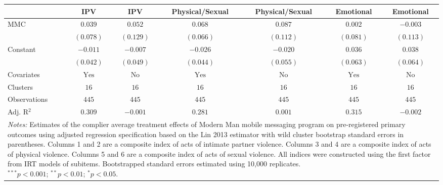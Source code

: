 
\begin{tabular}{l c c c c c c}
\toprule
 & IPV & IPV & Physical/Sexual & Physical/Sexual & Emotional & Emotional \\
\midrule
MMC          & $0.039$        & $0.052$       & $0.068$        & $0.087$       & $0.002$        & $-0.003$      \\
             & $(0.078)$      & $(0.129)$     & $(0.066)$      & $(0.112)$     & $(0.081)$      & $(0.113)$     \\
Constant     & $-0.011$       & $-0.007$      & $-0.026$       & $-0.020$      & $0.036$        & $0.038$       \\
             & $(0.042)$      & $(0.049)$     & $(0.044)$      & $(0.055)$     & $(0.063)$      & $(0.064)$     \\
\midrule
Covariates   & $\textrm{Yes}$ & $\textrm{No}$ & $\textrm{Yes}$ & $\textrm{No}$ & $\textrm{Yes}$ & $\textrm{No}$ \\
Clusters     & $16$           & $16$          & $16$           & $16$          & $16$           & $16$          \\
Observations & $445$          & $445$         & $445$          & $445$         & $445$          & $445$         \\
Adj. R$^2$   & $0.309$        & $-0.001$      & $0.281$        & $0.001$       & $0.315$        & $-0.002$      \\
\bottomrule
\multicolumn{7}{l}{\scriptsize{\parbox{\linewidth}{\vspace{2pt} 
       \textit{Notes:} Estimates of the complier average treatment effects of Modern Man mobile 
       messaging program on pre-registered primary outcomes using adjusted regression 
       specification based on the Lin 2013 estimator with wild cluster bootstrap 
       standard errors in parentheses. Columns 1 and 2 are a composite index of 
       acts of intimate partner violence. Columns 3 and 4 are a composite index of acts
       of physical violence. Columns 5 and 6 are a composite index of acts of sexual violence.
       All indices were constructed using the first factor from IRT models of subitems. 
       Bootstrapped standard errors estimated using 10,000 replicates. \\ $^{***}p<0.001$; $^{**}p<0.01$; $^{*}p<0.05$.}}}
\end{tabular}
